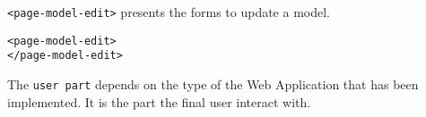 \texttt{<page-model-edit>} presents the forms to update a model.

\begin{lstlisting}[language=HTML5]
<page-model-edit>
</page-model-edit>
\end{lstlisting}

The \texttt{user part} depends on the type of the Web Application that has been implemented.
It is the part the final user interact with.


